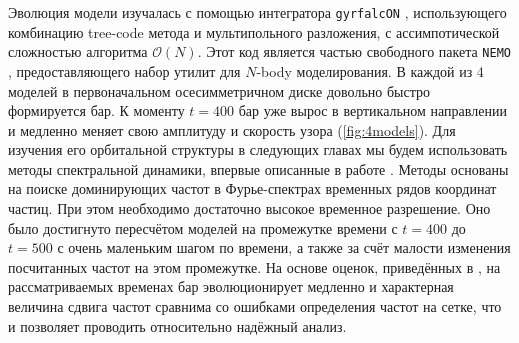 \documentclass{trlnotes}
\begin{document}
Эволюция модели изучалась с помощью интегратора \texttt{gyrfalcON} \cite{dehnen2002}, использующего комбинацию
tree-code метода и мультипольного разложения, с ассимпотической сложностью алгоритма $\mathcal O(N)$. Этот код 
является частью свободного пакета \texttt{NEMO} \citep{teuben1995a}, предоставляющего набор утилит для $N$-body 
моделирования. В каждой из 4 моделей в первоначальном осесимметричном диске довольно быстро формируется бар. К моменту $t=400$ бар уже вырос в вертикальном направлении и медленно меняет свою амплитуду и скорость узора (\ref{fig:4models}). Для изучения его орбитальной структуры в следующих главах мы будем использовать методы 
спектральной динамики, впервые описанные в работе \citet{binney1982}. Методы основаны на поиске доминирующих частот в Фурье-спектрах временных рядов координат частиц. При этом необходимо достаточно высокое временное разрешение. Оно было достигнуто пересчётом моделей на промежутке времени с $t=400$ до $t=500$ с очень маленьким шагом по времени, а также за счёт малости изменения посчитанных частот на этом промежутке. На основе оценок, приведённых в \cite{parul2020}, на 
рассматриваемых временах бар эволюционирует медленно и характерная величина сдвига частот сравнима со ошибками 
определения частот на сетке, что и позволяет проводить 
относительно надёжный анализ.
\end{document}
